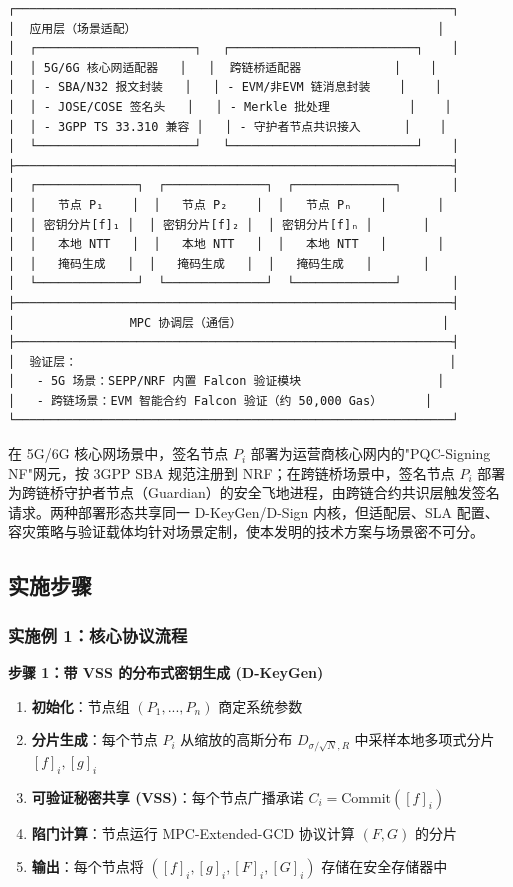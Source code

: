 \documentclass[12pt,a4paper]{article}
\begin{document}
\begin{verbatim}
┌─────────────────────────────────────────────────────────────┐
│  应用层（场景适配）                                          │
│  ┌──────────────────────┐   ┌──────────────────────────┐    │
│  │ 5G/6G 核心网适配器   │   │  跨链桥适配器             │    │
│  │ - SBA/N32 报文封装   │   │ - EVM/非EVM 链消息封装    │    │
│  │ - JOSE/COSE 签名头   │   │ - Merkle 批处理           │    │
│  │ - 3GPP TS 33.310 兼容 │   │ - 守护者节点共识接入      │    │
│  └──────────────────────┘   └──────────────────────────┘    │
├─────────────────────────────────────────────────────────────┤
│  ┌──────────────┐  ┌──────────────┐  ┌──────────────┐       │
│  │   节点 P₁    │  │   节点 P₂    │  │   节点 Pₙ    │       │
│  │ 密钥分片[f]₁ │  │ 密钥分片[f]₂ │  │ 密钥分片[f]ₙ │       │
│  │   本地 NTT   │  │   本地 NTT   │  │   本地 NTT   │       │
│  │   掩码生成   │  │   掩码生成   │  │   掩码生成   │       │
│  └──────────────┘  └──────────────┘  └──────────────┘       │
├─────────────────────────────────────────────────────────────┤
│                MPC 协调层（通信）                            │
├─────────────────────────────────────────────────────────────┤
│  验证层：                                                    │
│   - 5G 场景：SEPP/NRF 内置 Falcon 验证模块                   │
│   - 跨链场景：EVM 智能合约 Falcon 验证（约 50,000 Gas）      │
└─────────────────────────────────────────────────────────────┘
\end{verbatim}

在 5G/6G 核心网场景中，签名节点 $P_i$ 部署为运营商核心网内的"PQC-Signing NF"网元，按 3GPP SBA 规范注册到 NRF；在跨链桥场景中，签名节点 $P_i$ 部署为跨链桥守护者节点（Guardian）的安全飞地进程，由跨链合约共识层触发签名请求。两种部署形态共享同一 D-KeyGen/D-Sign 内核，但适配层、SLA 配置、容灾策略与验证载体均针对场景定制，使本发明的技术方案与场景密不可分。

\subsection{实施步骤}

\subsubsection{实施例 1：核心协议流程}

\textbf{步骤 1：带 VSS 的分布式密钥生成 (D-KeyGen)}

\begin{enumerate}
    \item \textbf{初始化}：节点组 $(P_1, ..., P_n)$ 商定系统参数
    \item \textbf{分片生成}：每个节点 $P_i$ 从缩放的高斯分布 $D_{\sigma/\sqrt{N}, R}$ 中采样本地多项式分片 $[f]_i, [g]_i$
    \item \textbf{可验证秘密共享 (VSS)}：每个节点广播承诺 $C_i = \text{Commit}([f]_i)$
    \item \textbf{陷门计算}：节点运行 MPC-Extended-GCD 协议计算 $(F, G)$ 的分片
    \item \textbf{输出}：每个节点将 $([f]_i, [g]_i, [F]_i, [G]_i)$ 存储在安全存储器中
\end{enumerate}
\end{document}
